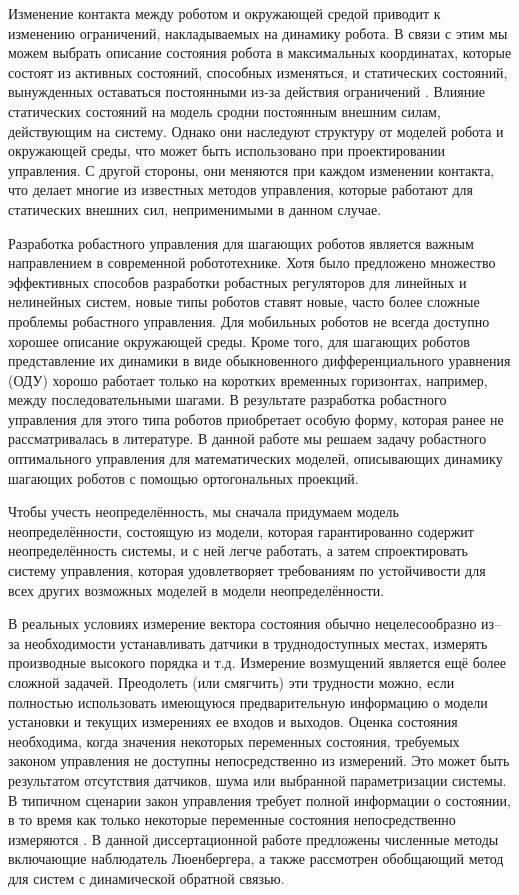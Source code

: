 Изменение контакта между роботом и окружающей средой приводит к изменению ограничений, накладываемых на динамику робота. В связи с этим мы можем выбрать описание состояния робота в максимальных координатах, которые состоят из активных состояний, способных изменяться, и статических состояний, вынужденных оставаться постоянными из-за действия ограничений \cite{SAVIN2021}. Влияние статических состояний на модель сродни постоянным внешним силам, действующим на систему. Однако они наследуют структуру от моделей робота и окружающей среды, что может быть использовано при проектировании управления. С другой стороны, они меняются при каждом изменении контакта, что делает многие из известных методов управления, которые работают для статических внешних сил, неприменимыми в данном случае.

Разработка робастного управления для шагающих роботов является важным направлением в современной робототехнике. Хотя было предложено множество эффективных способов разработки робастных регуляторов для линейных \cite{POLYAK2021, Nicolett2018} и нелинейных \cite{HAUSWIRTH2024, Celentano2018} систем, новые типы роботов ставят новые, часто более сложные проблемы робастного управления. Для мобильных роботов не всегда доступно хорошее описание окружающей среды. Кроме того, для шагающих роботов представление их динамики в виде обыкновенного дифференциального уравнения (ОДУ) хорошо работает только на коротких временных горизонтах, например, между последовательными шагами. В результате разработка робастного управления для этого типа роботов приобретает особую форму, которая ранее не рассматривалась в литературе. В данной работе мы решаем задачу робастного оптимального управления для математических моделей, описывающих динамику шагающих роботов с помощью ортогональных проекций.

Чтобы учесть неопределённость, мы сначала придумаем модель неопределённости, состоящую из модели, которая гарантированно содержит неопределённость системы, и с ней легче работать, а затем спроектировать систему управления, которая удовлетворяет требованиям по устойчивости для всех других возможных моделей в модели неопределённости.

В реальных условиях измерение вектора состояния обычно нецелесообразно из--за необходимости устанавливать датчики в труднодоступных местах, измерять производные высокого порядка и т.д. Измерение возмущений является ещё более сложной задачей. Преодолеть (или смягчить) эти трудности можно, если полностью использовать имеющуюся предварительную информацию о модели установки и текущих измерениях ее входов и выходов. Оценка состояния необходима, когда значения некоторых переменных состояния, требуемых законом управления не доступны непосредственно из измерений. Это может быть результатом отсутствия датчиков, шума или выбранной параметризации системы. В типичном сценарии закон управления требует полной информации о состоянии, в то время как только некоторые переменные состояния непосредственно измеряются \cite{Ackermann2001}. В данной диссертационной работе предложены численные методы включающие наблюдатель Люенбергера, а также рассмотрен обобщающий метод для систем с динамической обратной связью.

